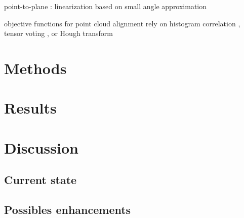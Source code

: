 \documentclass[twoside,twocolumn]{article}
\begin{document}
point-to-plane : linearization based on small angle approximation \cite{chen_object_1992}

objective functions for point cloud alignment rely on histogram correlation \cite{bosse_map_2008},
tensor voting \cite{reyes_registration_2007}, or Hough transform \cite{lowe_distinctive_2004}

\section{Methods}
\blindtext



\section{Results}
\blindtext


\section{Discussion}
\subsection{Current state}
\blindtext
\subsection{Possibles enhancements}
\blindtext

\printbibliography
\end{document}
